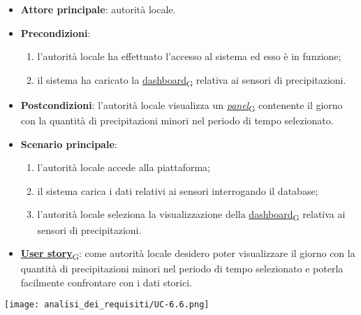 \begin{itemize}
	\item \textbf{Attore principale}: autorità locale.
	\item \textbf{Precondizioni}:
	      \begin{enumerate}
		      \item l'autorità locale ha effettuato l'accesso al sistema ed esso è in funzione;
		      \item il sistema ha caricato la \href{https://7last.github.io/docs/pb/documentazione-interna/glossario\#dashboard}{dashboard\textsubscript{G}} relativa ai sensori di precipitazioni.
	      \end{enumerate}
	\item \textbf{Postcondizioni}: l'autorità locale visualizza un \href{https://7last.github.io/docs/pb/documentazione-interna/glossario\#panel}{\textit{panel}\textsubscript{G}} contenente il giorno con la quantità di precipitazioni minori nel periodo di tempo selezionato.
	\item \textbf{Scenario principale}:
	      \begin{enumerate}
		      \item l'autorità locale accede alla piattaforma;
		      \item il sistema carica i dati relativi ai sensori interrogando il database;
		      \item l'autorità locale seleziona la visualizzazione della \href{https://7last.github.io/docs/pb/documentazione-interna/glossario\#dashboard}{dashboard\textsubscript{G}} relativa ai sensori di precipitazioni.
	      \end{enumerate}
	\item \href{https://7last.github.io/docs/pb/documentazione-interna/glossario\#user-story}{\textbf{User story}\textsubscript{G}}:
	      come autorità locale desidero poter visualizzare il giorno con la quantità di precipitazioni minori nel periodo di tempo selezionato
	      e poterla facilmente confrontare con i dati storici.
\end{itemize}
\begin{center}
	\texttt{[image: analisi\_dei\_requisiti/UC-6.6.png]}
\end{center}

